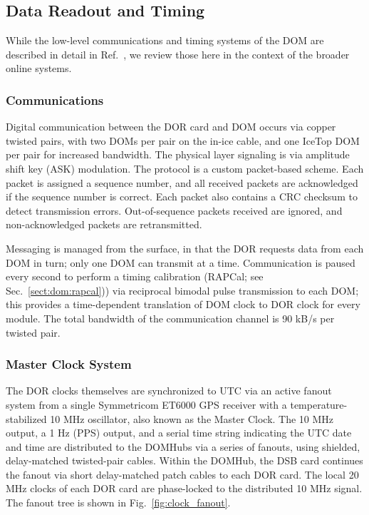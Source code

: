 \subsection{Data Readout and Timing}

While the low-level communications and timing systems of the DOM are
described in detail in Ref.~\cite{ref:domdaq}, we review those here in the
context of the broader online systems.

\subsubsection{\label{sect:online:comms}Communications}

Digital communication between the DOR card and DOM occurs via copper
twisted pairs, with two DOMs per pair on the in-ice cable, and one IceTop
DOM per pair for increased bandwidth.  The physical
layer signaling is via amplitude shift key (ASK) modulation.  The protocol
is a custom packet-based scheme.  Each packet is assigned a sequence 
number, and all received packets are acknowledged if the sequence number is
correct.  Each packet also contains a CRC checksum to detect transmission
errors.  Out-of-sequence packets received are ignored, and non-acknowledged
packets are retransmitted.  

Messaging is managed from the surface, in that the DOR requests data
from each DOM in turn; only one DOM can transmit at a time.  Communication
is paused every second to perform a timing calibration (RAPCal; see
Sec.~\ref{sect:dom:rapcal})) via reciprocal bimodal pulse transmission to
each DOM; this provides a time-dependent translation of DOM clock to DOR
clock for every module.  The total bandwidth of the communication channel
is 90 kB/s per twisted pair.   



\subsubsection{\label{sect:online:master_clock}Master Clock System}

The DOR clocks themselves are synchronized to UTC via an active fanout
system from a single Symmetricom ET6000 GPS receiver with a
temperature-stabilized 10 MHz oscillator, also known as the Master Clock.
The 10 MHz output, a 1 Hz (PPS) output, and a serial time string indicating
the UTC date and time are distributed 
to the DOMHubs via a series of fanouts, using shielded, delay-matched
twisted-pair cables.  Within the DOMHub, the DSB card continues the fanout
via short delay-matched patch cables to each DOR card.  The local 20 MHz
clocks of each DOR card are phase-locked to the distributed 10 MHz signal.
The fanout tree is shown in Fig.~\ref{fig:clock_fanout}.


